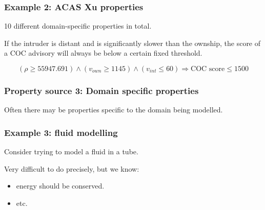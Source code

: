 \documentclass[t,compress,aspectratio=169]{beamer}
\begin{document}
\begin{frame}
\frametitle{Example 2: ACAS Xu properties}

10 different domain-specific properties in total.

\pause
\vspace{1em}

\begin{definition}
If the intruder is distant and is significantly slower than the ownship, the score of a COC advisory will always be below a certain fixed threshold.
\end{definition}

\pause
\begin{equation*}
(\rho \geq 55947.691) \wedge
(v_{own} \geq 1145) \wedge (v_{int} \leq 60)  \Rightarrow \text{COC score} \leq  1500
\end{equation*}
\end{frame}


\begin{frame}
\frametitle{Property source 3: Domain specific properties}

Often there may be properties specific to the domain being modelled.

\end{frame}


\begin{frame}
\frametitle{Example 3: fluid modelling}

Consider trying to model a fluid in a tube. 


Very difficult to do precisely, but we know:
\begin{itemize}
\item energy should be conserved.
\item etc.
\end{itemize}

\end{frame}
\end{document}
